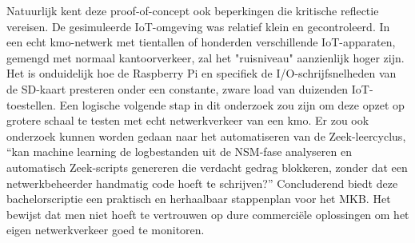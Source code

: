 Natuurlijk kent deze proof-of-concept ook beperkingen die kritische reflectie vereisen. De gesimuleerde IoT-omgeving was relatief klein en gecontroleerd. In een echt kmo-netwerk met tientallen of honderden verschillende IoT-apparaten, gemengd met normaal kantoorverkeer, zal het "ruisniveau" aanzienlijk hoger zijn. Het is onduidelijk hoe de Raspberry Pi en specifiek de I/O-schrijfsnelheden van de SD-kaart presteren onder een constante, zware load van duizenden IoT-toestellen. 
Een logische volgende stap in dit onderzoek zou zijn om deze opzet op grotere schaal te testen met echt netwerkverkeer van een kmo. Er zou ook onderzoek kunnen worden gedaan naar het automatiseren van de Zeek-leercyclus, “kan machine learning de logbestanden uit de NSM-fase analyseren en automatisch Zeek-scripts genereren die verdacht gedrag blokkeren, zonder dat een netwerkbeheerder handmatig code hoeft te schrijven?” Concluderend biedt deze bachelorscriptie een praktisch en herhaalbaar stappenplan voor het MKB. Het bewijst dat men niet hoeft te vertrouwen op dure commerciële oplossingen om het eigen netwerkverkeer goed te monitoren.

